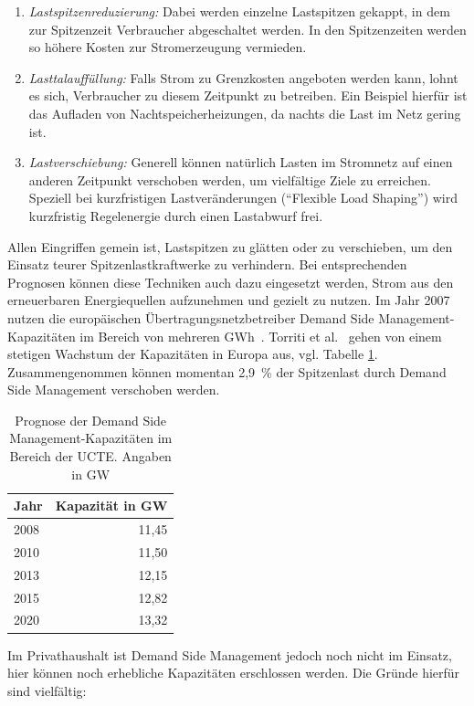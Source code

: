 \documentclass[12pt,BCOR=8.5mm]{scrartcl}
\begin{document}
\begin{enumerate}
  \item \emph{Lastspitzenreduzierung:} Dabei werden einzelne Lastspitzen
    gekappt, in dem zur Spitzenzeit Verbraucher abgeschaltet werden. In
    den Spitzenzeiten werden so höhere Kosten zur Stromerzeugung
    vermieden.
  \item \emph{Lasttalauffüllung:} Falls Strom zu Grenzkosten angeboten
    werden kann, lohnt es sich, Verbraucher zu diesem Zeitpunkt zu
    betreiben. Ein Beispiel hierfür ist das Aufladen von
    Nachtspeicherheizungen, da nachts die Last im Netz gering ist.
  \item \emph{Lastverschiebung:} Generell können natürlich Lasten im
    Stromnetz auf einen anderen Zeitpunkt verschoben werden, um
    vielfältige Ziele zu erreichen. Speziell bei kurzfristigen
    Lastveränderungen ("`Flexible Load Shaping"') wird kurzfristig
    Regelenergie durch einen Lastabwurf frei.
\end{enumerate}

Allen Eingriffen gemein ist, Lastspitzen zu glätten oder zu verschieben,
um den Einsatz teurer Spitzenlastkraftwerke zu verhindern. Bei
entsprechenden Prognosen können diese Techniken auch dazu eingesetzt
werden, Strom aus den erneuerbaren Energiequellen aufzunehmen und
gezielt zu nutzen. Im Jahr 2007 nutzen die europäischen
Übertragungsnetzbetreiber Demand Side Management-Kapazitäten im Bereich von
mehreren GWh~\cite{etso07demand}. Torriti et al.~\cite{torriti10demand}
gehen von einem stetigen Wachstum der Kapazitäten in Europa aus, vgl.
Tabelle \ref{tab:drforecast}. Zusammengenommen können momentan 2,9~\% der
Spitzenlast durch Demand Side Management verschoben werden.

\begin{table}
  \centering
  \begin{tabular}{|l|r|}
    \hline
    Jahr & Kapazität in GW \\
    \hline
    2008 & 11,45\\
    2010 & 11,50\\
    2013 & 12,15 \\
    2015 & 12,82 \\
    2020 & 13,32 \\
    \hline
  \end{tabular}
  \caption{Prognose der Demand Side Management-Kapazitäten im Bereich
  der UCTE. Angaben in GW}
  \label{tab:drforecast}
\end{table}

Im Privathaushalt ist Demand Side Management jedoch noch nicht im
Einsatz, hier können noch erhebliche Kapazitäten erschlossen werden. Die
Gründe hierfür sind vielfältig: 
\end{document}
